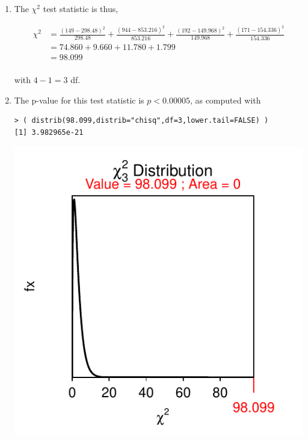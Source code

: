 \documentclass[10pt,openany]{book}\usepackage[]{graphicx}\usepackage[]{color}
\makeatletter
\newenvironment{kframe}{%
 \def\at@end@of@kframe{}%
 \ifinner\ifhmode%
  \def\at@end@of@kframe{\end{minipage}}%
  \begin{minipage}{\columnwidth}%
 \fi\fi%
 \def\FrameCommand##1{\hskip\@totalleftmargin \hskip-\fboxsep
 \colorbox{shadecolor}{##1}\hskip-\fboxsep
     \hskip-\linewidth \hskip-\@totalleftmargin \hskip\columnwidth}%
 \MakeFramed {\advance\hsize-\width
   \@totalleftmargin\z@ \linewidth\hsize
   \@setminipage}}%
 {\par\unskip\endMakeFramed%
 \at@end@of@kframe}
\newenvironment{knitrout}{}{} %
\makeatother
\begin{document}
\begin{itemize}
\begin{enumerate}
      \item The $\chi^{2}$ test statistic is thus,
        \begin{center}
          \[  \begin{split}
            \chi^{2} &= \frac{(149-298.48)^{2}}{298.48} + \frac{(944-853.216)^{2}}{853.216} + \frac{(192-149.968)^{2}}{149.968} + \frac{(171-154.336)^{2}}{154.336} \\
            &= 74.860 + 9.660 + 11.780 + 1.799 \\
            & = 98.099 \\
          \end{split}  \]
        \end{center}
        with $4-1=3$ df.
      \item The p-value for this test statistic is $p<0.00005$, as computed with
\begin{knitrout}
\color{fgcolor}\begin{kframe}
\begin{verbatim}
> ( distrib(98.099,distrib="chisq",df=3,lower.tail=FALSE) )
[1] 3.982965e-21
\end{verbatim}
\end{kframe}

{\centering \includegraphics[width=.4\linewidth]{Figs/unnamed-chunk-399-1} 

}




\end{knitrout}
\end{enumerate}
\end{itemize}
\end{document}
